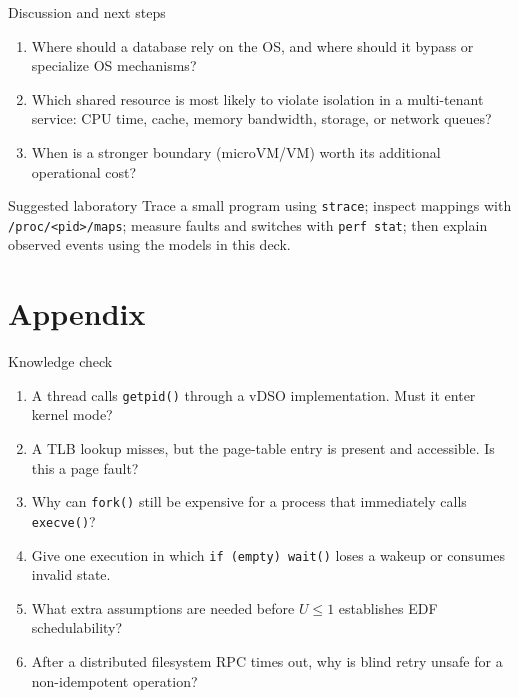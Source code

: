 \documentclass[aspectratio=169,11pt]{beamer}
\newcommand{\code}[1]{\texttt{#1}}
\begin{document}
\begin{frame}{Discussion and next steps}
  \begin{enumerate}
    \item Where should a database rely on the OS, and where should it bypass or specialize OS mechanisms?
    \item Which shared resource is most likely to violate isolation in a multi-tenant service: CPU time, cache, memory bandwidth, storage, or network queues?
    \item When is a stronger boundary (microVM/VM) worth its additional operational cost?
  \end{enumerate}
  \begin{block}{Suggested laboratory}
    Trace a small program using \code{strace}; inspect mappings with \code{/proc/<pid>/maps}; measure faults and switches with \code{perf stat}; then explain observed events using the models in this deck.
  \end{block}
\end{frame}

\appendix
\section{Appendix}

\begin{frame}{Knowledge check}
  \begin{enumerate}
    \item A thread calls \code{getpid()} through a vDSO implementation. Must it enter kernel mode?
    \item A TLB lookup misses, but the page-table entry is present and accessible. Is this a page fault?
    \item Why can \code{fork()} still be expensive for a process that immediately calls \code{execve()}?
    \item Give one execution in which \code{if (empty) wait()} loses a wakeup or consumes invalid state.
    \item What extra assumptions are needed before $U\leq1$ establishes EDF schedulability?
    \item After a distributed filesystem RPC times out, why is blind retry unsafe for a non-idempotent operation?
  \end{enumerate}
\end{frame}
\end{document}
